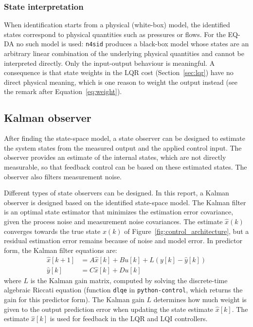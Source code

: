 \documentclass[12pt,a4paper]{article}
\begin{document}
\newpage
\subsubsection{State interpretation}
\label{sec:state_interpretation}
When identification starts from a physical (white-box) model, the identified states correspond to physical quantities such as pressures or flows. For the EQ-DA no such model is used: \texttt{n4sid} produces a black-box model whose states are an arbitrary linear combination of the underlying physical quantities and cannot be interpreted directly. Only the input-output behaviour is meaningful. A consequence is that state weights in the LQR cost (Section~\ref{sec:lqr}) have no direct physical meaning, which is one reason to weight the output instead (see the remark after Equation~\eqref{eq:weight}).

\newpage
\subsection{Kalman observer}
After finding the state-space model, a state observer can be designed to estimate the system states from the measured output and the applied control input. The observer provides an estimate of the internal states, which are not directly measurable, so that feedback control can be based on these estimated states. The observer also filters measurement noise.

Different types of state observers can be designed. In this report, a Kalman observer is designed based on the identified state-space model. The Kalman filter is an optimal state estimator that minimizes the estimation error covariance, given the process noise and measurement noise covariances. The estimate $\hat{x}(k)$ converges towards the true state $x(k)$ of Figure~\ref{fig:control_architecture}, but a residual estimation error remains because of noise and model error. In predictor form, the Kalman filter equations are:
\begin{equation}
\begin{aligned}
\hat{x}[k+1] &= A \hat{x}[k] + B u[k] + L (y[k] - \hat{y}[k]) \\
\hat{y}[k] &= C \hat{x}[k] + D u[k]
\end{aligned}
\label{eq:kalman}
\end{equation}
where $L$ is the Kalman gain matrix, computed by solving the discrete-time algebraic Riccati equation (function \texttt{dlqe} in \texttt{python-control}, which returns the gain for this predictor form). The Kalman gain $L$ determines how much weight is given to the output prediction error when updating the state estimate $\hat{x}[k]$. The estimate $\hat{x}[k]$ is used for feedback in the LQR and LQI controllers.
\end{document}
